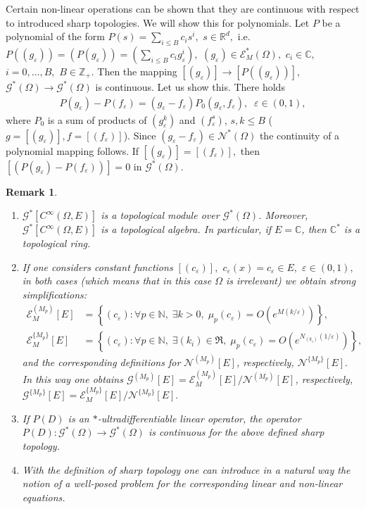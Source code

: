 \documentclass[sn-mathphys,Numbered]{sn-jnl}%
\theoremstyle{thmstyleone}%
\theoremstyle{thmstyletwo}%
\newtheorem{remark}{Remark}%
\theoremstyle{thmstylethree}%
\begin{document}
Certain non-linear operations can be shown that they are continuous with respect to introduced sharp topologies. We will show this for polynomials.  Let $P$ be a polynomial of the form $P(s)=\sum_{i\leq B}c_is^i, $ $s\in\mathbb R^d, $  i.e.  $P((g_\varepsilon))=(P(g_\varepsilon))=\left(\sum_{i\leq B}c_i g_\varepsilon^i\right), $ $(g_\varepsilon)\in \mathcal E_M^*(\Omega),$ $c_i\in\mathbb C, $ $i=0,\dots,B,$ $B\in\mathbb Z_+.$  Then the mapping $[(g_\varepsilon)]\to [P((g_\varepsilon))], $ $\mathcal G^*(\Omega)\to \mathcal G^*(\Omega)$ is continuous.  Let us show this. There holds
\begin{align*}
P(g_\varepsilon)-P(f_\varepsilon)=(g_\varepsilon-f_\varepsilon) P_0(g_\varepsilon,f_\varepsilon),\;\;\varepsilon\in(0,1),
\end{align*} 
where $P_0$ is a sum of products of $(g_\varepsilon^k)$  and $(f_\varepsilon^s)$,  $s,k\leq B$ ($g=[(g_\varepsilon)], f=[(f_\varepsilon)]$).  Since $(g_\varepsilon-f_\varepsilon)\in \mathcal{N}^*(\Omega)$ the continuity of a polynomial mapping follows.  If $[(g_\varepsilon)]=[(f_\varepsilon)],$ then $[(P(g_\varepsilon)-P(f_\varepsilon))]=0$ in $\mathcal{G}^\ast(\Omega).$

\begin{remark}\label{main}
\begin{enumerate}
\item $\mathcal{G}^{*}[C^\infty(\Omega,E)]$  is a topological module over $\mathcal{G}^{*}(\Omega)$.  Moreover, $\mathcal{G}^{*}[C^\infty(\Omega,E)]$ is  a topological algebra.  In particular, if $E=\mathbb C$, then $\mathbb{C}^{*}$ is a topological ring. 
\item If one considers constant functions $[(c_\varepsilon)],$  $c_\varepsilon(x)=c_\varepsilon\in E,$ $\varepsilon\in (0,1),$ in both cases (which means that in this case $\Omega $ is irrelevant) we obtain strong simplifications: 
\begin{align*}
\mathcal E^{(M_p)}_M[E] & =\left\{(c_\varepsilon): \forall p\in\mathbb N, \;\exists k>0, \;\mu_p(c_\varepsilon)=O(e^{M(k/\varepsilon)})\right\},\\
\mathcal E^{\{M_p\}}_M[E] & =\left\{(c_\varepsilon): \forall p\in\mathbb N, \;\exists (k_i) \in\mathfrak{R}, \;\mu_p(c_\varepsilon)=O(e^{N_{(k_i)}(1/\varepsilon)})\right\},
 \end{align*}
and the corresponding definitions for $\mathcal N^{(M_p)}[E]$, respectively,   $\mathcal N^{\{M_p\}}[E].$ In this way one obtains  $\mathcal G^{(M_p)}[E]=\mathcal{E}^{(M_p)}_M[E]/\mathcal{N}^{(M_p)}[E]$, respectively,  $\mathcal G^{\{M_p\}}[E]=\mathcal{E}^{\{M_p\}}_M[E]/\mathcal{N}^{\{M_p\}}[E].$
\item If $P(D)$ is an $*$-ultradifferentiable linear operator, the operator $P(D)\colon \mathcal{G}^*(\Omega)\to \mathcal{G}^*(\Omega)$ is continuous for the above defined sharp topology.
\item With the definition of sharp topology one can introduce in a natural way the notion of a well-posed problem for the corresponding linear and non-linear equations.
\end{enumerate}
\end{remark}
\end{document}
